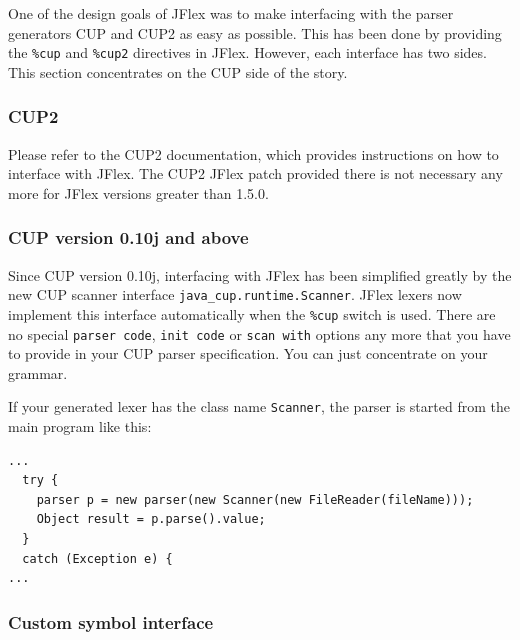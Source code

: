 
One of the design goals of JFlex was to make interfacing with the parser
generators CUP \autocite{CUP} and CUP2 \autocite{CUP2} as easy as
possible. This has been done by providing the \texttt{\%cup} and
\texttt{\%cup2} directives in JFlex. However, each interface has two
sides. This section concentrates on the CUP side of the story.

\subsubsection{CUP2}\label{cup2}

Please refer to the CUP2 \autocite{CUP2} documentation, which provides
instructions on how to interface with JFlex. The CUP2 JFlex patch
provided there is not necessary any more for JFlex versions greater than
1.5.0.

\subsubsection{CUP version 0.10j and
above}\label{cup-version-0.10j-and-above}

Since CUP version 0.10j, interfacing with JFlex has been simplified
greatly by the new CUP scanner interface
\texttt{java\_cup.runtime.Scanner}. JFlex lexers now implement this
interface automatically when the \texttt{\%cup} switch is used. There
are no special \texttt{parser\ code}, \texttt{init\ code} or
\texttt{scan\ with} options any more that you have to provide in your
CUP parser specification. You can just concentrate on your grammar.

If your generated lexer has the class name \texttt{Scanner}, the parser
is started from the main program like this:

\begin{verbatim}
...
  try {
    parser p = new parser(new Scanner(new FileReader(fileName)));
    Object result = p.parse().value;
  }
  catch (Exception e) {
...
\end{verbatim}

\subsubsection{Custom symbol interface}\label{custom-symbol-interface}

